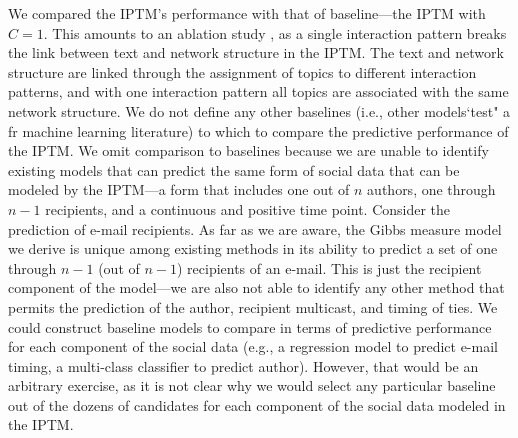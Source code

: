 \documentclass{article}
\begin{document}
 	   We compared the IPTM's performance with that of baseline---the IPTM with $C=1$. This amounts to an ablation study \citep{richardson2006beyond,bilgic2010active}, as a single interaction pattern breaks the link between text and network structure in the IPTM. The text and network structure are linked through the assignment of topics to different interaction patterns, and with one interaction pattern all topics are associated with the same network structure. We do not define any other baselines (i.e., other models`test" a fr machine learning literature) to which to compare the predictive performance of the IPTM. We omit comparison to baselines because we are unable to identify existing models that can predict the same form of social data that can be modeled by the IPTM---a form that includes one out of $n$ authors, one through $n-1$ recipients, and a continuous and positive time point. Consider the prediction of e-mail recipients. As far as we are aware, the Gibbs measure model we derive is unique among existing methods in its ability to predict a set of one through $n-1$ (out of $n-1$) recipients of an e-mail. This is just the recipient component of the model---we are also not able to identify any other method that permits the prediction of the author, recipient multicast, and timing of ties. We could construct baseline models to compare in terms of predictive performance for each component of the social data (e.g., a regression model to predict e-mail timing, a multi-class classifier to predict author). However, that would be an arbitrary exercise, as it is not clear why we would select any particular baseline out of the dozens of candidates for each component of the social data modeled in the IPTM. 
 	   
\end{document}

